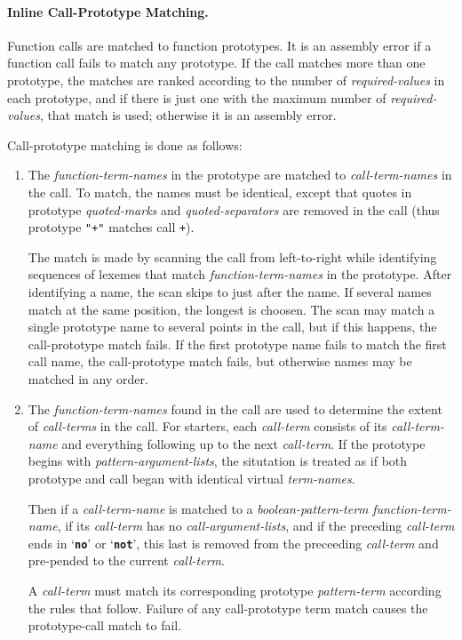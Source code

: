 \documentclass[12pt]{article}
\newcommand{\subsubsubsection}[1]{\paragraph[#1]{#1.}}
\newcommand{\TT}[1]{{\tt \bfseries #1}}
\begin{document}
\subsubsubsection{Inline Call-Prototype Matching}
\label{INLINE-CALL-PROTOTYPE-MATCHING}

Function calls are matched to function prototypes.  It is
an assembly error if a function call fails to match any
prototype.  If the call matches more than one prototype, the
matches are ranked according to the number of {\em required-values}
in each prototype, and if there is just one with the maximum
number of {\em required-values}, that match is used; otherwise
it is an assembly error.

Call-prototype matching is done as follows:

\begin{enumerate}
\item The {\em function-term-names} in the prototype are matched to
{\em call-term-names} in the call.  To match, the names must be identical,
except that quotes in prototype
{\em quoted-marks} and {\em quoted-separators} are removed in the call
(thus prototype {\tt "+"} matches call {\tt +}).

The match is made by scanning the call from left-to-right
while identifying sequences of lexemes that match
{\em function-term-names} in the prototype.  After identifying
a name, the scan skips to just after the name.  If several
names match at the same position, the longest is choosen.
The scan may match a single prototype name to several points in the
call, but if this happens, the call-prototype match fails.
If the first prototype name fails to match the first call name,
the call-prototype match fails, but otherwise names may be matched
in any order.

\item
The {\em function-term-names} found in the call are used to determine
the extent of {\em call-terms} in the call.  For starters, each
{\em call-term} consists of its {\em call-term-name} and everything
following up to the next {\em call-term}.  If the prototype begins
with {\em pattern-argument-lists}, the situtation is treated as
if both prototype and call began with identical virtual
{\em term-names}.

Then if a {\em call-term-name} is matched to a {\em boolean-pattern-term}
{\em function-term-name}, if its {\em call-term} has no
{\em call-argument-lists}, and if the preceding {\em call-term}
ends in `\TT{no}' or `\TT{not}', this last is removed from the
preceeding {\em call-term} and pre-pended to the
current {\em call-term}.

A {\em call-term}
must match its corresponding prototype {\em pattern-term} according
the rules that follow.  Failure of any call-prototype term match
causes the prototype-call match to fail.


\end{enumerate}
\end{document}
